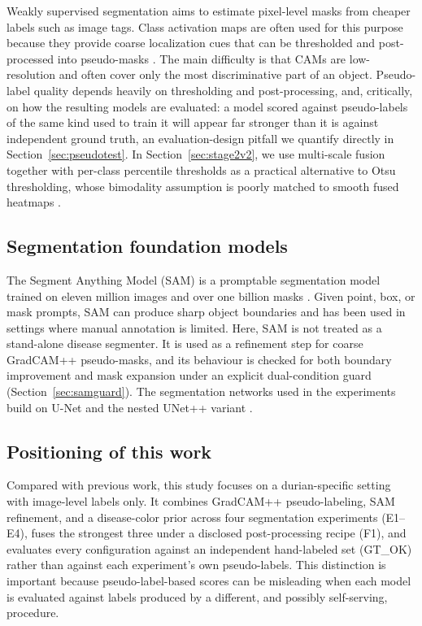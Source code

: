 \documentclass[final,5p,times,twocolumn,authoryear]{elsarticle}
\begin{document}
Weakly supervised segmentation aims to estimate pixel-level masks from cheaper labels such as image tags. Class activation maps are often used for this purpose because they provide coarse localization cues that can be thresholded and post-processed into pseudo-masks \citep{barbedo2019plant}. The main difficulty is that CAMs are low-resolution and often cover only the most discriminative part of an object. Pseudo-label quality depends heavily on thresholding and post-processing, and, critically, on how the resulting models are evaluated: a model scored against pseudo-labels of the same kind used to train it will appear far stronger than it is against independent ground truth, an evaluation-design pitfall we quantify directly in Section~\ref{sec:pseudotest}. In Section~\ref{sec:stage2v2}, we use multi-scale fusion together with per-class percentile thresholds as a practical alternative to Otsu thresholding, whose bimodality assumption is poorly matched to smooth fused heatmaps \citep{otsu1979threshold}.

\subsection{Segmentation foundation models}

The Segment Anything Model (SAM) is a promptable segmentation model trained on eleven million images and over one billion masks \citep{kirillov2023segment}. Given point, box, or mask prompts, SAM can produce sharp object boundaries and has been used in settings where manual annotation is limited. Here, SAM is not treated as a stand-alone disease segmenter. It is used as a refinement step for coarse GradCAM++ pseudo-masks, and its behaviour is checked for both boundary improvement and mask expansion under an explicit dual-condition guard (Section~\ref{sec:samguard}). The segmentation networks used in the experiments build on U-Net \citep{ronneberger2015unet} and the nested UNet++ variant \citep{zhou2018unet++}.

\subsection{Positioning of this work}

Compared with previous work, this study focuses on a durian-specific setting with image-level labels only. It combines GradCAM++ pseudo-labeling, SAM refinement, and a disease-color prior across four segmentation experiments (E1--E4), fuses the strongest three under a disclosed post-processing recipe (F1), and evaluates every configuration against an independent hand-labeled set (GT\_OK) rather than against each experiment's own pseudo-labels. This distinction is important because pseudo-label-based scores can be misleading when each model is evaluated against labels produced by a different, and possibly self-serving, procedure.
\end{document}
